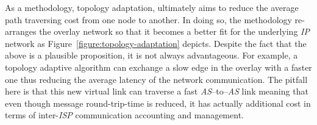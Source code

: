 As a methodology, topology adaptation, ultimately aims to reduce the 
average path traversing cost from one node to another.
In doing so, the methodology re-arranges the
overlay network so that it becomes a better fit 
for the underlying \emph{IP} network
as Figure~\ref{figure:topology-adaptation} depicts.
Despite the fact that the above is a plausible proposition,
it is not always advantageous. For example, a topology adaptive
algorithm can exchange a slow edge in the overlay with a faster one
thus reducing the average latency of the network communication.
The pitfall here is that this new virtual link
can traverse a fast \emph{AS}--to--\emph{AS} link meaning that even though
message round-trip-time is reduced, it has actually additional cost in terms of
inter-\emph{ISP} communication accounting and management.
\begin{figure}[ht]
\centering
{}\qquad\qquad
{}
\end{figure}
